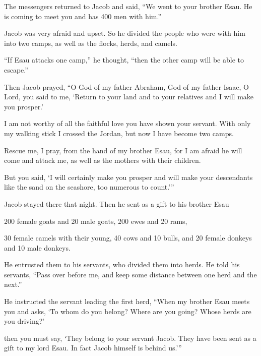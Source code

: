 \begin{scripture}
 The messengers returned to Jacob and said, ``We went to your brother Esau. He is coming to meet you and has 400 men with him.''
 Jacob was very afraid and upset. So he divided the people who were with him into two camps, as well as the flocks, herds, and camels.
 ``If Esau attacks one camp,'' he thought, ``then the other camp will be able to escape.''
\everypar{}

 Then Jacob prayed, ``O God of my father Abraham, God of my father Isaac, O Lord, you said to me, `Return to your land and to your relatives and I will make you prosper.'
 I am not worthy of all the faithful love you have shown your servant. With only my walking stick I crossed the Jordan, but now I have become two camps.
 Rescue me, I pray, from the hand of my brother Esau, for I am afraid he will come and attack me, as well as the mothers with their children.
 But you said, `I will certainly make you prosper and will make your descendants like the sand on the seashore, too numerous to count.'''
\everypar{}

 Jacob stayed there that night. Then he sent as a gift to his brother Esau
 200 female goats and 20 male goats, 200 ewes and 20 rams,
 30 female camels with their young, 40 cows and 10 bulls, and 20 female donkeys and 10 male donkeys.
 He entrusted them to his servants, who divided them into herds. He told his servants, ``Pass over before me, and keep some distance between one herd and the next.''
 He instructed the servant leading the first herd, ``When my brother Esau meets you and asks, `To whom do you belong? Where are you going? Whose herds are you driving?'
 then you must say, `They belong to your servant Jacob. They have been sent as a gift to my lord Esau. In fact Jacob himself is behind us.'''
\everypar{}


\end{scripture}
